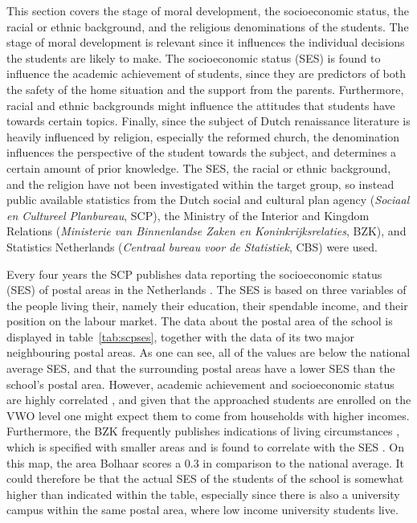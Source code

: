 This section covers the stage of moral development, the socioeconomic status, the racial or ethnic background, and the religious denominations of the students. The stage of moral development is relevant since it influences the individual decisions the students are likely to make. The socioeconomic status (SES) is found to influence the academic achievement of students, since they are predictors of both the safety of the home situation and the support from the parents. Furthermore, racial and ethnic backgrounds might influence the attitudes that students have towards certain topics. Finally, since the subject of Dutch renaissance literature is heavily influenced by religion, especially the reformed church, the denomination influences the perspective of the student towards the subject, and determines a certain amount of prior knowledge. The SES, the racial or ethnic background, and the religion have not been investigated within the target group, so instead public available statistics from the Dutch social and cultural plan agency (\emph{Sociaal en Cultureel Planbureau}, SCP), the Ministry of the Interior and Kingdom Relations (\emph{Ministerie van Binnenlandse Zaken en Koninkrijksrelaties}, BZK),  and Statistics Netherlands (\emph{Centraal bureau voor de Statistiek}, CBS) were used.


Every four years the SCP publishes data reporting the socioeconomic status (SES) of postal areas in the Netherlands \cite{scp}. The SES is based on three variables of the people living their, namely their education, their spendable income, and their position on the labour market. The data about the postal area of the school is displayed in table~\ref{tab:scpses}, together with the data of its two major neighbouring postal areas. As one can see, all of the values are below the national average SES, and that the surrounding postal areas have a lower SES than the school's postal area. However, academic achievement and socioeconomic status are highly correlated \cite{academicsocioeconomic}, and given that the approached students are enrolled on the VWO level one might expect them to come from households with higher incomes. Furthermore, the BZK frequently publishes indications of living circumstances \cite{bzk}, which is specified with smaller areas and is found to correlate with the SES \cite{knol}. On this map, the area Bolhaar scores a 0.3 in comparison to the national average. It could therefore be that the actual SES of the students of the school is somewhat higher than indicated within the table, especially since there is also a university campus within the same postal area, where low income university students live.

